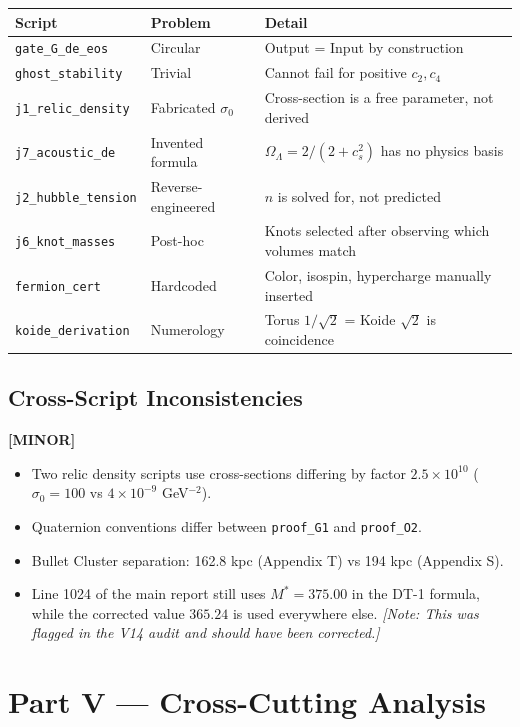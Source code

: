 \documentclass[12pt, a4paper]{article}
\newcommand{\minor}{\textcolor{minor}{\textbf{[MINOR]}}}
\begin{document}
\begin{center}
\begin{tabular}{llp{6cm}}
\toprule
Script & Problem & Detail \\
\midrule
\texttt{gate\_G\_de\_eos} & Circular & Output = Input by construction \\
\texttt{ghost\_stability} & Trivial & Cannot fail for positive $c_2, c_4$ \\
\texttt{j1\_relic\_density} & Fabricated $\sigma_0$ & Cross-section is a free parameter, not derived \\
\texttt{j7\_acoustic\_de} & Invented formula & $\Omega_\Lambda = 2/(2 + c_s^2)$ has no physics basis \\
\texttt{j2\_hubble\_tension} & Reverse-engineered & $n$ is solved for, not predicted \\
\texttt{j6\_knot\_masses} & Post-hoc & Knots selected after observing which volumes match \\
\texttt{fermion\_cert} & Hardcoded & Color, isospin, hypercharge manually inserted \\
\texttt{koide\_derivation} & Numerology & Torus $1/\sqrt{2}$ = Koide $\sqrt{2}$ is coincidence \\
\bottomrule
\end{tabular}
\end{center}

\subsection{Cross-Script Inconsistencies}
\minor{}

\begin{itemize}
    \item Two relic density scripts use cross-sections differing by factor $2.5 \times 10^{10}$ ($\sigma_0 = 100$ vs $4 \times 10^{-9}$ GeV$^{-2}$).
    \item Quaternion conventions differ between \texttt{proof\_G1} and \texttt{proof\_O2}.
    \item Bullet Cluster separation: 162.8 kpc (Appendix T) vs 194 kpc (Appendix S).
    \item Line 1024 of the main report still uses $M^* = 375.00$ in the DT-1 formula, while the corrected value $365.24$ is used everywhere else. \textit{[Note: This was flagged in the V14 audit and should have been corrected.]}
\end{itemize}

\section{Part V --- Cross-Cutting Analysis}
\end{document}
